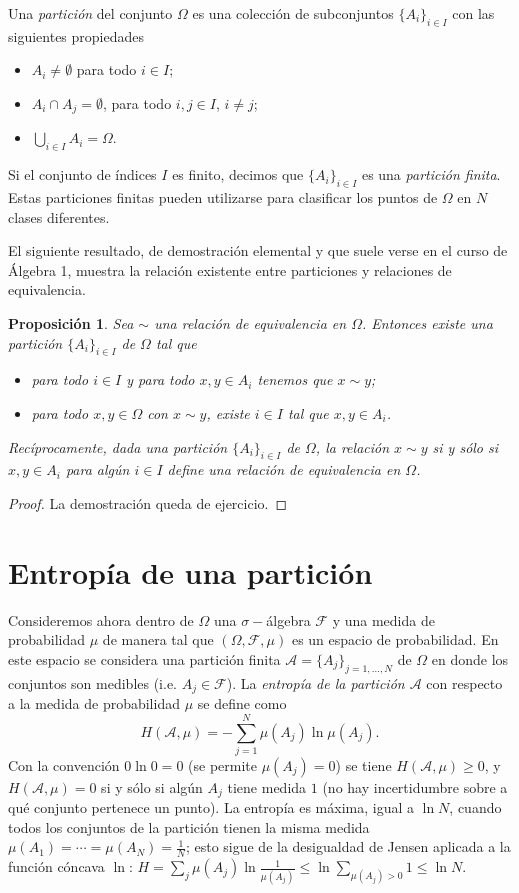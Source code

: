 \documentclass[12pt, a4paper]{amsbook}
\newcommand{\F}{{\mathcal F}}
\newcommand{\A}{{\mathcal A}}
\newtheorem{prop}[teo]{Proposici\'on}
\theoremstyle{remark}
\theoremstyle{definition}
\numberwithin{section}{chapter}
\numberwithin{subsection}{section}
\numberwithin{equation}{section}
\numberwithin{figure}{chapter}
\begin{document}
Una {\em partición} del conjunto $\Omega$ es una colección de subconjuntos $\{A_i\}_{i\in I}$ con las siguientes propiedades
\begin{itemize}
\item[(i)] $A_i\neq\emptyset$ para todo $i\in I$;
\item[(ii)] $A_i\cap A_j=\emptyset$, para todo $i, j\in I$, $i\neq j$;
\item[(iii)] $\bigcup_{i\in I} A_i = \Omega$.
\end{itemize}
Si el conjunto de índices $I$ es finito, decimos que $\{A_i\}_{i\in I}$ es una {\em partición finita}. Estas particiones finitas pueden utilizarse para clasificar los puntos de $\Omega$ en $N$ clases diferentes.

El siguiente resultado, de demostración elemental y que suele verse en el curso de Álgebra 1, muestra la relación existente entre particiones y relaciones de equivalencia.
\begin{prop}
Sea $\sim$ una relación de equivalencia en $\Omega$. Entonces existe una partición $\{A_i\}_{i\in I}$ de $\Omega$ tal que
\begin{itemize}
\item[(i)] para todo $i\in I$ y para todo $x, y\in A_i$ tenemos que $x\sim y$;
\item[(ii)] para todo $x, y\in \Omega$ con $x\sim y$, existe $i\in I$ tal que $x, y\in A_i$.
\end{itemize}
Recíprocamente, dada una partición $\{A_i\}_{i\in I}$ de $\Omega$, la relación $x\sim y$ si y sólo si $x, y\in A_i$ para algún $i\in I$ define una relación de equivalencia en $\Omega$.
\end{prop}

\begin{proof}
La demostración queda de ejercicio.
\end{proof}

\section{Entropía de una partición}\label{sec.c10.2}

Consideremos ahora dentro de $\Omega$ una $\sigma-$álgebra $\F$ y una medida de probabilidad $\mu$ de manera tal que $(\Omega, \F,\mu)$ es un espacio de probabilidad. En este espacio se considera una partición finita $\A = \{A_j\}_{j=1,\dots,N}$ de $\Omega$ en donde los conjuntos son medibles (i.e. $A_j\in \F$). La {\em entropía de la partición $\A$} con respecto a la medida de probabilidad $\mu$ se define como
$$
H(\A, \mu) = -\sum_{j=1}^N \mu(A_j)\ln \mu(A_j).
$$
Con la convención $0\ln0=0$ (se permite $\mu(A_j)=0$) se tiene $H(\A,\mu)\ge0$, y $H(\A,\mu)=0$ si y sólo si algún $A_j$ tiene medida $1$ (no hay incertidumbre sobre a qué conjunto pertenece un punto). La entropía es máxima, igual a $\ln N$, cuando todos los conjuntos de la partición tienen la misma medida $\mu(A_1) = \cdots = \mu(A_N) = \frac{1}{N}$; esto sigue de la desigualdad de Jensen aplicada a la función cóncava $\ln$: $H=\sum_j\mu(A_j)\ln\frac1{\mu(A_j)}\le\ln\sum_{\mu(A_j)>0}1\le\ln N$.
\end{document}
